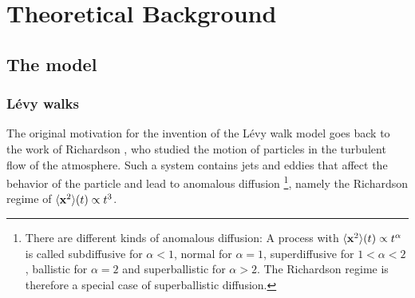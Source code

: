 \chapter{Theoretical Background}

\section{The model}

\subsection{L\'evy walks}

The original motivation for the invention of the L\'evy walk model goes back to the work of Richardson
\cite{richardson},
 who studied the motion of particles in the turbulent flow of the atmosphere. Such a system contains jets and eddies that affect the behavior of the particle and lead to anomalous diffusion
\footnote{There are different kinds of anomalous diffusion: A process with $\langle \mathbf{ x }^2 \rangle(t) \propto t^{\alpha}$ is called subdiffusive for $\alpha<1$, normal for $\alpha = 1$, superdiffusive for $1<\alpha<2$, ballistic for $\alpha=2$ and superballistic for $\alpha > 2 $. The Richardson regime is therefore a special case of superballistic diffusion.}, 
namely the Richardson regime of $\langle \mathbf{ x }^2 \rangle(t) \propto t^3 $.

